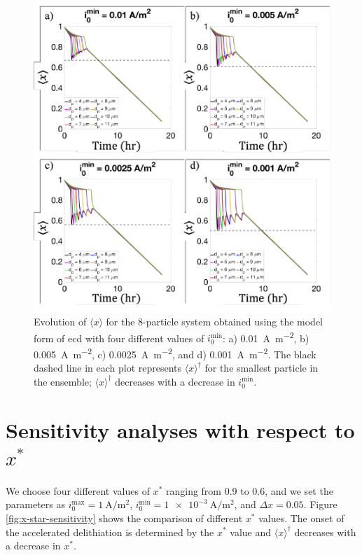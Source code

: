 \documentclass{article}
\begin{document}
\begin{figure}
  \includegraphics[width=\textwidth]{8-particle-evolution-i0min.pdf}
  \caption{Evolution of $\langle x \rangle$ for the 8-particle system obtained using
    the model form of \gls{ecd} with four different values of
    $i_0^{\mathrm{min}}$: a) \SI{0.01}{\ampere\per\meter\squared}, b)
    \SI{0.005}{\ampere\per\meter\squared}, c)
    \SI{0.0025}{\ampere\per\meter\squared}, and d)
    \SI{0.001}{\ampere\per\meter\squared}. The black dashed line in
    each plot represents $\langle x \rangle^\dag$ for the smallest particle in the
    ensemble; $\langle x \rangle^\dag$ decreases with a decrease in $i_0^{\mathrm{min}}$.}
  \label{fig:i0-sensitivity}
\end{figure}

\section{Sensitivity analyses with respect to $x^{\ast}$}

We choose four different values of $x^{\ast}$ ranging from 0.9 to 0.6,
and we set the parameters as
$i_0^{\mathrm{max}}=\SI{1}{\ampere\per\meter\squared}$,
$i_0^{\mathrm{min}}=\SI{1e-3}{\ampere\per\meter\squared}$, and $\Delta
x=0.05$. Figure \ref{fig:x-star-sensitivity} shows the comparison of
different $x^{\ast }$ values. The onset of the accelerated
delithiation is determined by the $x^\ast$ value and $\langle x
\rangle^\dag$ decreases with a decrease in $x^\ast$.
\end{document}
